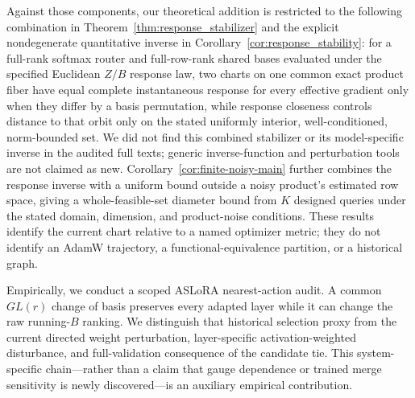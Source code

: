 Against those components, our theoretical addition is restricted to the
following combination in Theorem~\ref{thm:response_stabilizer} and the explicit
nondegenerate quantitative inverse in
Corollary~\ref{cor:response_stability}: for a full-rank softmax router and
full-row-rank shared bases evaluated under the specified Euclidean $Z/B$
response law,
two charts on one common exact product fiber have equal complete instantaneous
response for every effective gradient only when they differ by a basis
permutation, while response closeness controls distance to that orbit only on the stated uniformly
interior, well-conditioned, norm-bounded set.  We did not find this combined
stabilizer or its model-specific inverse in the audited full texts; generic
inverse-function and perturbation tools are not claimed as new.
Corollary~\ref{cor:finite-noisy-main} further combines the response inverse
with a uniform bound outside a noisy product's estimated row space, giving
a whole-feasible-set diameter bound from $K$ designed queries under the
stated domain, dimension, and product-noise conditions.  These results
identify the current chart relative to a named optimizer metric; they do not
identify an AdamW trajectory, a functional-equivalence partition, or a
historical graph.

Empirically, we conduct a scoped ASLoRA nearest-action audit.  A common
$GL(r)$ change of basis preserves every adapted layer while it can change the
raw running-$B$ ranking.  We distinguish that historical selection proxy from
the current directed weight perturbation, layer-specific activation-weighted
disturbance, and full-validation consequence of the candidate tie.  This
system-specific chain---rather than a claim that gauge dependence or trained
merge sensitivity is newly discovered---is an auxiliary empirical
contribution.
